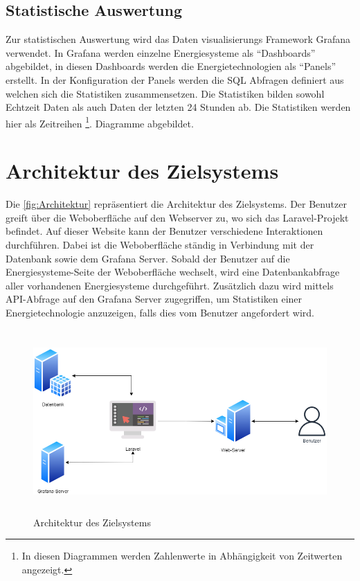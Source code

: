 \subsection{Statistische Auswertung}
Zur statistischen Auswertung wird das Daten visualisierungs Framework Grafana verwendet. In Grafana werden einzelne Energiesysteme als “Dashboards” abgebildet, in diesen Dashboards werden die Energietechnologien als “Panels” erstellt. In der Konfiguration der Panels werden die SQL Abfragen definiert aus welchen sich die Statistiken zusammensetzen. Die Statistiken bilden sowohl Echtzeit Daten als auch Daten der letzten 24 Stunden ab. Die Statistiken werden hier als Zeitreihen \footnote{ In diesen Diagrammen werden Zahlenwerte in Abhängigkeit von Zeitwerten angezeigt.	
 }. Diagramme abgebildet.


\newpage
\section{Architektur des Zielsystems}
Die \autoref{fig:Architektur} repräsentiert die Architektur des Zielsystems. Der Benutzer greift über die Weboberfläche auf den Webserver zu, wo sich das Laravel-Projekt befindet. Auf dieser Website kann der Benutzer verschiedene Interaktionen durchführen. Dabei ist die Weboberfläche ständig in Verbindung mit der Datenbank sowie dem Grafana Server. Sobald der Benutzer auf die Energiesysteme-Seite der Weboberfläche wechselt, wird eine Datenbankabfrage aller vorhandenen Energiesysteme durchgeführt. Zusätzlich dazu wird mittels API-Abfrage auf den Grafana Server zugegriffen, um Statistiken einer Energietechnologie anzuzeigen, falls dies vom Benutzer angefordert wird.

\begin{figure}[h]
	\centering
	\includegraphics[height=7cm,width=15cm]{images/Architektur}
	\caption{Architektur des Zielsystems}
	\label{fig:Architektur}
\end{figure}

